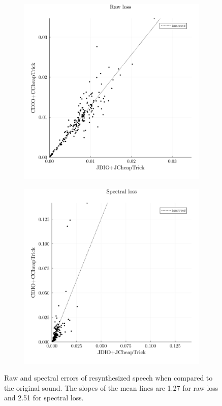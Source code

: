 \documentclass[a4paper]{article}
\begin{document}
\begin{figure}
    \begin{subfigure}[b]{0.5\textwidth}
        \centering
        \includegraphics{graphics/raw_loss.png}
        \caption{}
    \end{subfigure}
    \begin{subfigure}[b]{0.5\textwidth}
        \centering
        \includegraphics{graphics/spectral_loss.png}
        \caption{}
    \end{subfigure}
    \caption{Raw and spectral errors of resynthesized speech when compared to the original sound. The slopes of the mean lines are 1.27 for raw loss and 2.51 for spectral loss.}
    \label{fig:losses}
\end{figure}
\end{document}
